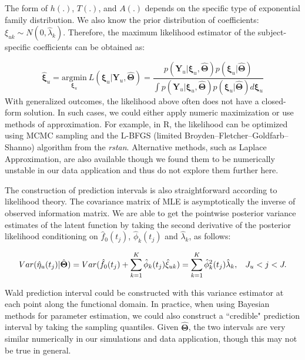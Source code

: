 \documentclass[12pt]{article}
\begin{document}
The form of $h(.)$, $T(.)$, and $A(.)$ depends on the specific type of exponential family distribution. We also know the prior distribution of coefficients: $\xi_{uk} \sim N(0, \hat{\lambda}_k)$. Therefore, the maximum likelihood estimator of the subject-specific coefficients can be obtained as:

\[
    \hat{\boldsymbol{\xi}}_u = 
    \underset{\boldsymbol{\xi}_u}{\mathrm{argmin}} \ L(\boldsymbol{\xi}_u|\boldsymbol{Y}_u, 
    \hat{\mathbf{\Theta}}) = \frac{p(\boldsymbol{Y}_u|\boldsymbol{\xi}_u, \hat{\mathbf{\Theta}})p(\boldsymbol{\xi}_u|\hat{\mathbf{\Theta}})}{\int p(\boldsymbol{Y}_u|\boldsymbol{\xi}_u, \hat{\mathbf{\Theta}})p(\boldsymbol{\xi}_u|\hat{\mathbf{\Theta}})d\boldsymbol{\xi}_u}
\]
With generalized outcomes, the likelihood above often does not have a closed-form solution. In such cases, we could either apply numeric maximization or use methods of approximation. For example, in R, the likelihood can be optimized using MCMC sampling and the L-BFGS (limited Broyden–Fletcher–Goldfarb–Shanno) algorithm from the \textit{rstan}. Alternative methods, such as Laplace Approximation, are also available though we found them to be numerically unstable in our data application and thus do not explore them further here. 



The construction of prediction intervals is also straightforward according to likelihood theory. The covariance matrix of MLE is asymptotically the inverse of observed information matrix. We are able to get the pointwise posterior variance estimates of the latent function by taking the second derivative of the posterior likelihood conditioning on $\hat{f}_0(t_j)$, $\hat{\phi}_k(t_j)$ and $\hat{\lambda}_k$, as follows:

\[
Var(\hat{\eta}_u(t_j)|\hat{\mathbf{\Theta}})  = Var(\hat{f}_0(t_j)+\sum_{k=1}^K\hat{\phi}_k(t_j)\hat{\xi}_{uk})
=\sum_{k=1}^K \hat{\phi}_k^2(t_j)\hat{\lambda}_k,
\hspace{0.3cm}  J_u < j < J.
\]

Wald prediction interval could be constructed with this variance estimator at each point along the functional domain. In practice, when using Bayesian methods for parameter estimation, we could also construct a ``credible" prediction interval by taking the sampling quantiles. Given $\hat{\mathbf{\Theta}}$, the two intervals are very similar numerically in our simulations and data application, though this may not be true in general. 
\end{document}
